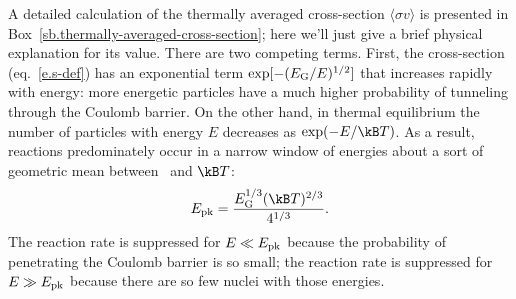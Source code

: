 A detailed calculation of the thermally averaged cross-section $\langle\sigma v\rangle$ is presented in Box~\ref{sb.thermally-averaged-cross-section}; here we'll just give a brief physical explanation for its value. There are two competing terms. First, the cross-section (eq.~\ref{e.s-def}) has an exponential term $\exp[-(E_{\mathrm{G}}/E)^{1/2}]$ that increases rapidly with energy: more energetic particles have a much higher probability of tunneling through the Coulomb barrier. On the other hand, in thermal equilibrium the number of particles with energy $E$ decreases as $\exp(-E/\kB T)$.
As a result, reactions predominately occur in a narrow window of energies about a sort of geometric mean between \EG\ and $\kB T$:
\[	\Epk = \frac{\EG^{1/3}(\kB T)^{2/3}}{4^{1/3}}. \]
The reaction rate is suppressed for $E\ll E_{\mathrm{pk}}$ because the probability of penetrating the Coulomb barrier is so small; the reaction rate is suppressed for $E\gg E_{\mathrm{pk}}$ because there are so few nuclei with those energies.


